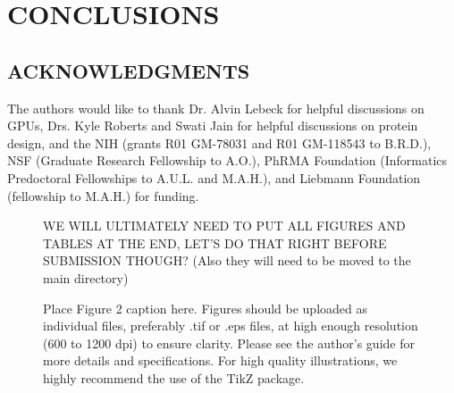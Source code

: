 \documentclass[12pt]{article}
\begin{document}
\section*{\sffamily \Large CONCLUSIONS}


\subsection*{\sffamily \large ACKNOWLEDGMENTS}
The authors would like to thank Dr. Alvin Lebeck for helpful discussions on GPUs, Drs. Kyle Roberts and Swati Jain for helpful discussions on protein design, and the NIH (grants R01 GM-78031 and R01 GM-118543 to B.R.D.), NSF (Graduate Research Fellowship to A.O.), PhRMA Foundation (Informatics Predoctoral Fellowships to A.U.L. and M.A.H.), and Liebmann Foundation (fellowship to M.A.H.) for funding.   

\clearpage






\clearpage


\begin{figure}
\caption{\label{cc} WE WILL ULTIMATELY NEED TO PUT ALL FIGURES AND TABLES AT THE END, LET'S DO THAT RIGHT BEFORE SUBMISSION THOUGH?  (Also they will need to be moved to the main directory)}
\end{figure}

\begin{figure}
\caption{\label{fig2} Place Figure 2 caption here. Figures should be uploaded as individual files, preferably .tif or .eps files, at high enough resolution (600 to 1200 dpi) to ensure clarity. Please see the author’s guide for more details and specifications. For high quality illustrations, we highly recommend the use of the TikZ package.}
\end{figure}






\clearpage
\end{document}
